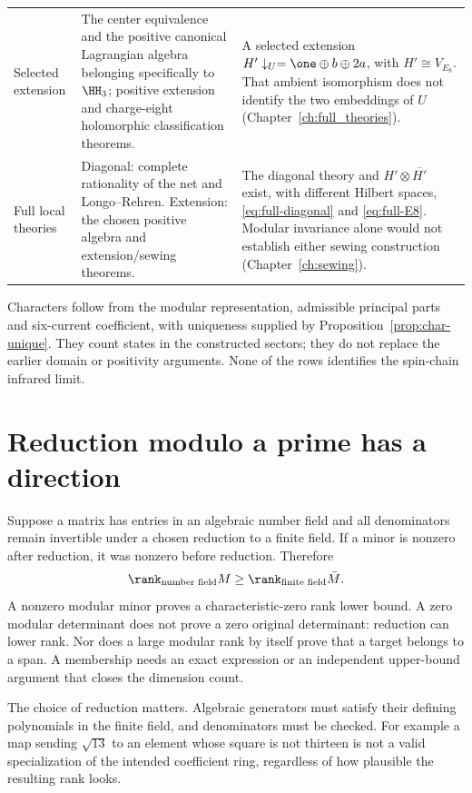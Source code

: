 \begin{longtable}{@{}>{\raggedright\arraybackslash}p{}
 >{\raggedright\arraybackslash}p{}
 >{\raggedright\arraybackslash}p{}@{}}
Selected extension &
The center equivalence and the positive canonical Lagrangian
algebra belonging specifically to $\HH_3$; positive extension
and charge-eight holomorphic classification theorems. &
A selected extension
$H'\downarrow_U=\one\oplus b\oplus2a$, with $H'\cong V_{E_8}$.
That ambient isomorphism does not identify the two embeddings
of $U$ (Chapter~\ref{ch:full_theories}).\\[5pt]

Full local theories &
Diagonal: complete rationality of the net and Longo--Rehren.
Extension: the chosen positive algebra and extension/sewing theorems. &
The diagonal theory and $H'\otimes\overline{H'}$ exist, with
different Hilbert spaces, \eqref{eq:full-diagonal} and
\eqref{eq:full-E8}. Modular invariance alone would not establish
either sewing construction
(Chapter~\ref{ch:sewing}).\\
\bottomrule
\end{longtable}
\endgroup

Characters follow from the modular representation, admissible
principal parts and six-current coefficient, with uniqueness supplied by
Proposition~\ref{prop:char-unique}. They count states in the constructed
sectors; they do not replace the earlier domain or positivity
arguments. None of the rows identifies the spin-chain infrared limit.

\section{Reduction modulo a prime has a direction}

Suppose a matrix has entries in an algebraic number field and
all denominators remain invertible under a chosen reduction to
a finite field. If a minor is nonzero after reduction, it was
nonzero before reduction. Therefore
\[
 \rank_{\text{number field}}M\ge\rank_{\text{finite field}}\bar M.
\]
A nonzero modular minor proves a characteristic-zero rank lower
bound. A zero modular determinant does not prove a zero original
determinant: reduction can lower rank. Nor does a large modular
rank by itself prove that a target belongs to a span. A membership
needs an exact expression or an independent upper-bound argument
that closes the dimension count.

The choice of reduction matters. Algebraic generators must satisfy
their defining polynomials in the finite field, and denominators
must be checked. For example a map sending $\sqrt{13}$ to an
element whose square is not thirteen is not a valid specialization
of the intended coefficient ring, regardless of how plausible
the resulting rank looks.

